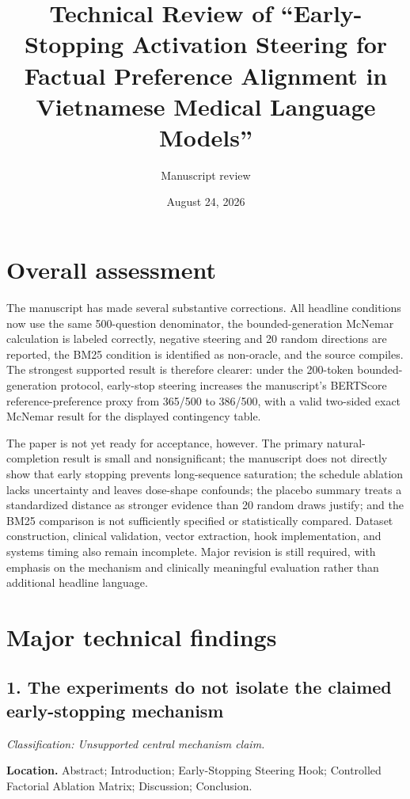 \documentclass[11pt]{article}
\title{Technical Review of ``Early-Stopping Activation Steering for Factual Preference Alignment in Vietnamese Medical Language Models''}
\author{Manuscript review}
\date{August 24, 2026}
\newcommand{\findinglabel}[1]{\textbf{#1}}
\newcommand{\classification}[1]{\textit{Classification: #1.}}
\begin{document}
\maketitle

\section*{Overall assessment}

The manuscript has made several substantive corrections.  All headline conditions now use the same 500-question denominator, the bounded-generation McNemar calculation is labeled correctly, negative steering and 20 random directions are reported, the BM25 condition is identified as non-oracle, and the source compiles.  The strongest supported result is therefore clearer: under the 200-token bounded-generation protocol, early-stop steering increases the manuscript's BERTScore reference-preference proxy from 365/500 to 386/500, with a valid two-sided exact McNemar result for the displayed contingency table.

The paper is not yet ready for acceptance, however.  The primary natural-completion result is small and nonsignificant; the manuscript does not directly show that early stopping prevents long-sequence saturation; the schedule ablation lacks uncertainty and leaves dose-shape confounds; the placebo summary treats a standardized distance as stronger evidence than 20 random draws justify; and the BM25 comparison is not sufficiently specified or statistically compared.  Dataset construction, clinical validation, vector extraction, hook implementation, and systems timing also remain incomplete.  Major revision is still required, with emphasis on the mechanism and clinically meaningful evaluation rather than additional headline language.

\section*{Major technical findings}

\subsection*{1. The experiments do not isolate the claimed early-stopping mechanism}

\classification{Unsupported central mechanism claim}

\findinglabel{Location.} Abstract; Introduction; Early-Stopping Steering Hook; Controlled Factorial Ablation Matrix; Discussion; Conclusion.
\end{document}
